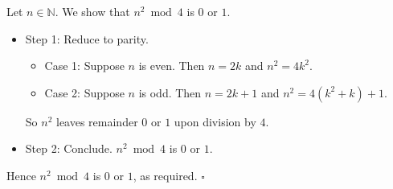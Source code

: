 Let $n \in \mathbb{N}$.
We show that $n^{2} \bmod 4$ is $0$ or $1$.

\begin{itemize}
  \item Step 1: Reduce to parity.
    \begin{itemize}
      \item Case 1: Suppose $n$ is even.
        Then $n = 2k$ and $n^{2} = 4k^{2}$.
      \item Case 2: Suppose $n$ is odd.
        Then $n = 2k + 1$ and $n^{2} = 4(k^{2} + k) + 1$.
    \end{itemize}

    So $n^{2}$ leaves remainder $0$ or $1$ upon division by $4$.
  \item Step 2: Conclude.
    $n^{2} \bmod 4$ is $0$ or $1$.
\end{itemize}

Hence $n^{2} \bmod 4$ is $0$ or $1$, as required. \hfill$\square$